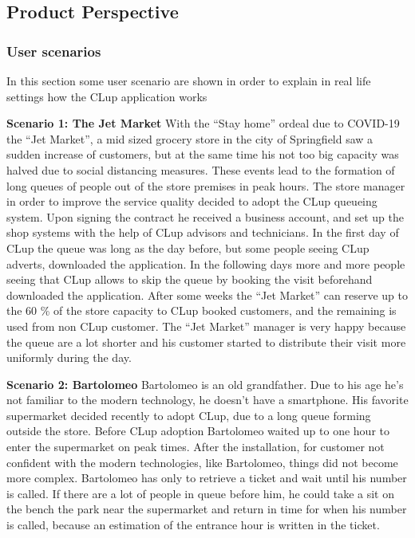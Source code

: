 \subsection{Product Perspective}
\setlength{\parskip}{1em}
\subsubsection{User scenarios}
In this section some user scenario are shown in order to explain in real life settings how the CLup application works

\textbf{Scenario 1: The Jet Market}
With the ``Stay home'' ordeal due to COVID-19 the ``Jet Market'', a mid sized grocery store in the city of Springfield saw a sudden increase of customers, but at the same time his not too big capacity was halved due to social distancing measures. These events lead to the formation of long queues of people out of the store premises in peak hours. The store manager in order to improve the service quality decided to adopt the CLup queueing system. Upon signing the contract he received a business account, and set up the shop systems with the help of CLup advisors and technicians. In the first day of CLup the queue was long as the day before, but some people seeing CLup adverts, downloaded the application. In the following days more and more people seeing that CLup allows to skip the queue by booking the visit beforehand downloaded the application. After some weeks the ``Jet Market'' can reserve up to the 60 \% of the store capacity to CLup booked customers, and the remaining is used from non CLup customer. The ``Jet Market'' manager is very happy because the queue are a lot shorter and his customer started to distribute their visit more uniformly during the day.

\textbf{Scenario 2: Bartolomeo}
Bartolomeo is an old grandfather. Due to his age he's not familiar to the modern technology, he doesn't have a smartphone. His favorite supermarket decided recently to adopt CLup, due to a long queue forming outside the store. 
Before CLup adoption Bartolomeo waited up to one hour to enter the supermarket on peak times. After the installation, for customer not confident with the modern technologies, like Bartolomeo, things did not become more complex. Bartolomeo has only to retrieve a ticket and wait until his number is called. If there are a lot of people in queue before him, he could take a sit on the bench the park near the supermarket and return in time for when his number is called, because an estimation of the entrance hour is written in the ticket.

